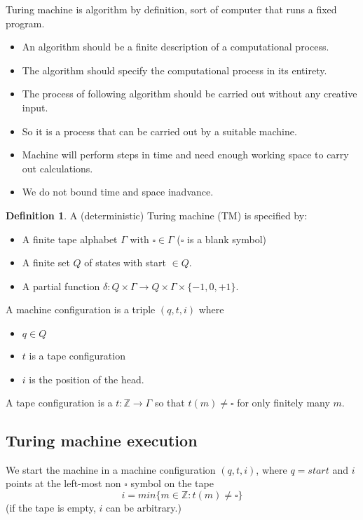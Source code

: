 \documentclass[a4paper,12pt]{article}
\theoremstyle{definition}
\newtheorem{definition}[counter]{Definition}
\theoremstyle{remark}
\newcommand{\Z}{\mathbb{Z}}
\begin{document}
Turing machine is algorithm by definition, sort of computer that runs a fixed program.

\begin{itemize}
    \item An algorithm should be a finite description of a computational process.
    \item The algorithm should specify the computational process in its entirety.
    \item The process of following algorithm should be carried out without any creative input.
    \item So it is a process that can be carried out by a suitable machine.
    \item Machine will perform steps in time and need enough working space to carry out calculations.
    \item We do not bound time and space inadvance.
\end{itemize}

\begin{definition}
    A (deterministic) Turing machine (TM) is specified by:
    \begin{itemize}
        \item A finite tape alphabet $\Gamma$ with $\square \in \Gamma$ ($\square$ is a blank symbol)
        \item A finite set $Q$ of states with start $\in Q$.
        \item A partial function $\delta: Q \times \Gamma \to Q \times \Gamma \times \{-1, 0, +1\}$.
    \end{itemize}
\end{definition}

A machine configuration is a triple $(q, t, i)$ where
\begin{itemize}
    \item $q \in Q$
    \item $t$ is a tape configuration
    \item $i$ is the position of the head.
\end{itemize}

A tape configuration is a $t: \Z \to \Gamma$ so that $t(m) \neq \square$ for only finitely many $m$.

\subsection{Turing machine execution}
We start the machine in a machine configuration $(q, t, i)$, where $q = start$ and $i$ points at the left-most non $\square$ symbol
on the tape
\begin{equation*}
    i = min\{m \in \Z: t(m) \neq \square\}
\end{equation*}
(if the tape is empty, $i$ can be arbitrary.)
\end{document}
